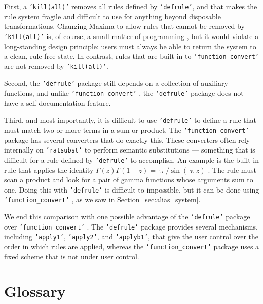 \documentclass[12pt,fleqn]{extarticle}
\newcommand{\ttq}[1]{\texttt{'#1'}}
\newcommand{\funconvert}{\ttq{function\_convert}{ }}
\begin{document}
First, a \ttq{kill(all)} removes all rules defined by \ttq{defrule}, and that makes the rule system fragile and difficult to use for anything beyond disposable transformations. Changing Maxima to allow rules that cannot be removed by \ttq{kill(all)} is, of course, a small matter of programming \cite{nardi-small-matter}, but it would violate a long-standing design principle: users must always be able to return the system to a clean, rule-free state.  In contrast, rules that are built-in to \funconvert are not removed by \ttq{kill(all)}.

Second, the \ttq{defrule} package still depends on a collection of auxiliary functions, and unlike
\funconvert, the \ttq{defrule} package does not have a self-documentation feature.

Third, and most importantly, it is difficult to use \ttq{defrule} to define a rule that must match two or more terms in a sum or product. The \funconvert package has several converters that do exactly this. These converters often rely internally on \ttq{ratsubst} to perform semantic substitutions --- something that is difficult for a rule defined by \ttq{defrule} to accomplish. An example is the built-in rule that applies the identity \(\Gamma(z)\Gamma(1-z)=\uppi/\sin(\uppi z)\) . The rule must scan a product and look for a pair of gamma functions whose arguments sum to one. Doing this with \ttq{defrule} is difficult to impossible, but it can be done using \funconvert,  as we saw in Section~\ref{sec:alias_system}.

We end this comparison with one possible advantage of the \ttq{defrule} package over \funconvert. The \ttq{defrule} package provides several mechanisms, including \ttq{apply1}, \ttq{apply2}, and \ttq{applyb1}, that give the user control over the order in which rules are applied, whereas the \funconvert package uses a fixed scheme that is not under user control.


\section{Glossary}
\end{document}
